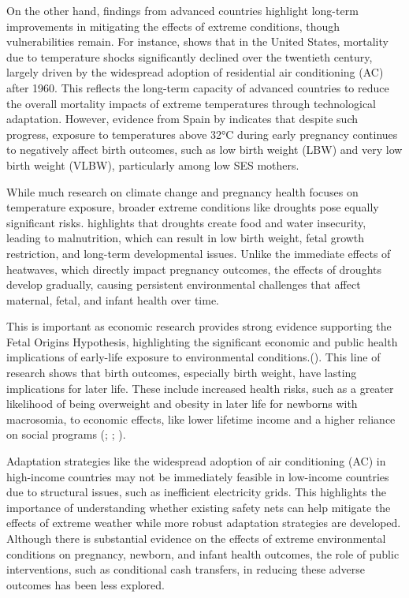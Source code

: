 \documentclass[12pt, oneside]{article}      %
\begin{document}
On the other hand, findings from advanced countries highlight long-term improvements in mitigating the effects of extreme conditions, though vulnerabilities remain. For instance, \cite{Barreca2016} shows that in the United States, mortality due to temperature shocks significantly declined over the twentieth century, largely driven by the widespread adoption of residential air conditioning (AC) after 1960. This reflects the long-term capacity of advanced countries to reduce the overall mortality impacts of extreme temperatures through technological adaptation. However, evidence from Spain by \cite{ConteKeivabu2022} indicates that despite such progress, exposure to temperatures above 32°C during early pregnancy continues to negatively affect birth outcomes, such as low birth weight (LBW) and very low birth weight (VLBW), particularly among low SES mothers. 

While much research on climate change and pregnancy health focuses on temperature exposure, broader extreme conditions like droughts pose equally significant risks. \cite{Ha2022} highlights that droughts create food and water insecurity, leading to malnutrition, which can result in low birth weight, fetal growth restriction, and long-term developmental issues. Unlike the immediate effects of heatwaves, which directly impact pregnancy outcomes, the effects of droughts develop gradually, causing persistent environmental challenges that affect maternal, fetal, and infant health over time.

This is important as economic research provides strong evidence supporting the Fetal Origins Hypothesis, highlighting the significant economic and public health implications of early-life exposure to environmental conditions.(\cite{Almond2011}). This line of research shows that birth outcomes, especially birth weight, have lasting implications for later life. These include increased health risks, such as a greater likelihood of being overweight and obesity in later life for newborns with macrosomia, to economic effects, like lower lifetime income and a higher reliance on social programs (\cite{Schellong2012}; \cite{Lambiris2021}; \cite{Bharadwaj2017}). 

Adaptation strategies like the widespread adoption of air conditioning (AC) in high-income countries may not be immediately feasible in low-income countries due to structural issues, such as inefficient electricity grids. This highlights the importance of understanding whether existing safety nets can help mitigate the effects of extreme weather while more robust adaptation strategies are developed. Although there is substantial evidence on the effects of extreme environmental conditions on pregnancy, newborn, and infant health outcomes, the role of public interventions, such as conditional cash transfers, in reducing these adverse outcomes has been less explored.
\end{document}
